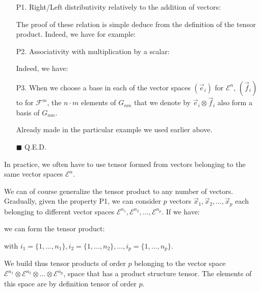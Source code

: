 	\begin{enumerate}
		\item[P1.] Right/Left distributivity relatively to the addition of vectors:
		
		The proof of these relation is simple deduce from the definition of the tensor product. Indeed, we have for example:
		
		
		\item[P2.] Associativity with multiplication by a scalar:
		
		Indeed, we have:
		
	
		\item[P3.] When we choose a base in each of the vector spaces $(\vec{e}_i)$ for $\mathcal{E}^n$, $(\vec{f}_i)$ to for $\mathcal{F}^m$, the $n\cdot m$ elements of $G_{nm}$ that we denote by $\vec{e}_i \otimes\vec{f}_i$ also form a basis of $G_{nm}$.
		\begin{dem}
			Already made in the particular example we used earlier above.
		\begin{flushright}
			$\blacksquare$  Q.E.D.
		\end{flushright}
		\end{dem}
	\end{enumerate}
	\begin{tcolorbox}[title=Remark,colframe=black,arc=10pt]
	In practice, we often have to use tensor formed from vectors belonging to the same vector spaces $\mathcal{E}^n$.
	\end{tcolorbox}
	We can of course generalize the tensor product to any number of vectors. Gradually, given the property P1, we can consider $p$ vectors $\vec{x}_1,\vec{x}_2,\ldots,\vec{x}_p$ each belonging to different vector spaces $\mathcal{E}^{n_1},\mathcal{E}^{n_2},\ldots,\mathcal{E}^{n_p}$. If we have:
	
	we can form the tensor product:
	
with $i_1=\{1,\ldots,n_1\},i_2=\{1,\ldots,n_2\},\ldots,i_p=\{1,\ldots,n_p\}$.

	We build thus tensor products of order $p$ belonging to the vector space $\mathcal{E}^{n_1}\otimes\mathcal{E}^{n_2}\otimes\ldots \otimes\mathcal{E}^{n_p}$, space that has a product structure tensor. The elements of this space are by definition tensor of order $p$.

